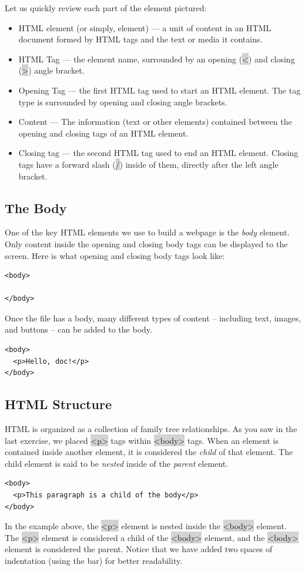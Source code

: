 \documentclass[11pt]{article}
\begin{document}
Let us quickly review each part of the element pictured:
\begin{itemize}[leftmargin = *]
\item HTML element (or simply, element) — a unit of content in an HTML document formed by HTML tags and the text or media it contains.
\item HTML Tag — the element name, surrounded by an opening (\colorbox{lightgray}{<}) and closing (\colorbox{lightgray}{>}) angle bracket. 
\item Opening Tag — the first HTML tag used to start an HTML element. The tag type is surrounded by opening and closing angle brackets.
\item Content — The information (text or other elements) contained between the opening and closing tags of an HTML element.
\item Closing tag — the second HTML tag used to end an HTML element. Closing tags have a forward slash (\colorbox{lightgray}{$/$}) inside of them, directly after the left angle bracket.
\end{itemize}

\subsection{The Body}
One of the key HTML elements we use to build a webpage is the \textit{body} element. Only content inside the opening and closing body tags can be displayed to the screen. Here is what opening and closing body tags look like:
\begin{lstlisting}
<body>

</body>
\end{lstlisting}
Once the file has a body, many different types of content – including text, images, and buttons – can be added to the body.
\begin{lstlisting}
<body>
  <p>Hello, doc!</p>
</body>
\end{lstlisting}

\subsection{HTML Structure}
HTML is organized as a collection of family tree relationships. As you saw in the last exercise, we placed \colorbox{lightgray}{<p>} tags within \colorbox{lightgray}{<body>} tags. When an element is contained inside another element, it is considered the \textit{child} of that element. The child element is said to be \textit{nested} inside of the \textit{parent} element.
\begin{lstlisting}
<body>
  <p>This paragraph is a child of the body</p>
</body>
\end{lstlisting}
In the example above, the \colorbox{lightgray}{<p>} element is nested inside the \colorbox{lightgray}{<body>} element. The \colorbox{lightgray}{<p>} element is considered a child of the \colorbox{lightgray}{<body>} element, and the \colorbox{lightgray}{<body>} element is considered the parent. Notice that we have added two spaces of indentation (using the  bar) for better readability. 
\end{document}
